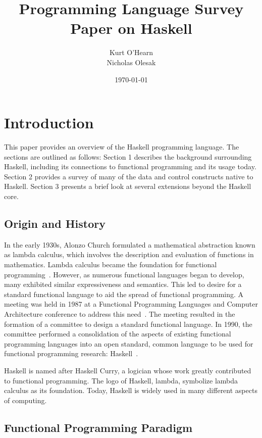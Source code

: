 \documentclass[titlepage,12pt]{article}
\title{Programming Language Survey Paper on Haskell}
\author{
        Kurt O'Hearn\\
        Nicholas Olesak\\
}
\date{\today}
\begin{document}
\maketitle 
\setcounter{tocdepth}{3}
\tableofcontents \newpage


\section{Introduction}
This paper provides an overview of the Haskell programming language.  The sections are outlined as follows:
Section 1 describes the background surrounding Haskell, including its connections to functional programming
and its usage today.  Section 2 provides a survey of many of the data and control constructs native to Haskell.
Section 3 presents a brief look at several extensions beyond the Haskell core.

\subsection{Origin and History}

In the early 1930s, Alonzo Church formulated a mathematical abstraction known as lambda calculus, which involves the description 
and evaluation of functions in mathematics. Lambda calculus became the foundation for functional programming~\cite{haskell-wiki}. 
However, as numerous functional languages began to develop, many exhibited similar expressiveness and semantics.  This led to
desire for a standard functional language to aid the spread of functional programming. A meeting was held 
in 1987 at a Functional Programming Languages and Computer Architecture conference to address this need~\cite{hudak-hist}. The meeting 
resulted in the formation of a committee to design a standard functional language. In 1990, the committee performed 
a consolidation of the aspects of existing functional programming languages into an open standard, common language to be used for 
functional programming research: Haskell~\cite{hudak-con}.

Haskell is named after Haskell Curry, a logician whose work greatly contributed to functional programming. The logo of Haskell, lambda,
symbolize lambda calculus as its foundation. Today, Haskell is widely used in many different aspects 
of computing.

\subsection{Functional Programming Paradigm}
\end{document}
